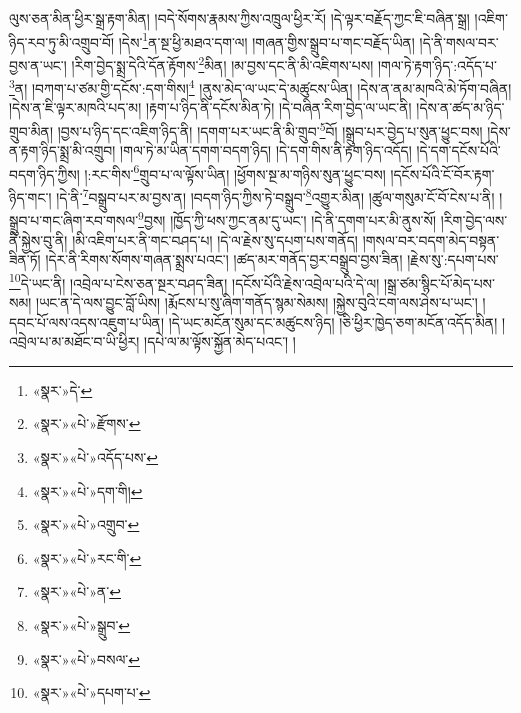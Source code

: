ལུས་ཅན་མིན་ཕྱིར་སྒྲ་རྟག་མིན། །བདེ་སོགས་རྣམས་ཀྱིས་འཁྲུལ་ཕྱིར་རོ། །དེ་ལྟར་བརྗོད་ཀྱང་ཇི་བཞིན་སྒྲ། །འཇིག་ཉིད་རབ་ཏུ་མི་འགྲུབ་བོ། །དེས་\footnote{«སྣར་»དེ་}ན་སྔ་ཕྱི་མཐའ་དག་ལ། །གཞན་གྱིས་སྒྲུབ་པ་གང་བརྗོད་ཡིན། །དེ་ནི་གསལ་བར་བྱས་ན་ཡང་། །རིག་བྱེད་སྨྲ་དེའི་དོན་རྟོགས་\footnote{«སྣར་»«པེ་»རྫོགས་}མིན། །མ་བྱས་དང་ནི་མི་འཇིགས་པས། །གལ་ཏེ་རྟག་ཉིད་:འདོད་པ་\footnote{«སྣར་»«པེ་»འདོད་པས་}ན། །བཀག་པ་ཙམ་གྱི་དངོས་:དག་གིས།\footnote{«སྣར་»«པེ་»དག་གི།} །ནུས་མེད་ལ་ཡང་དེ་མཚུངས་ཡིན། །དེས་ན་ནམ་མཁའི་མེ་ཏོག་བཞིན། །དེས་ན་ཇི་ལྟར་མཁའི་པད་མ། །རྟག་པ་ཉིད་ནི་དངོས་མིན་ཏེ། །དེ་བཞིན་རིག་བྱེད་ལ་ཡང་ནི། །དེས་ན་ཚད་མ་ཉིད་གྲུབ་མིན། །བྱས་པ་ཉིད་དང་འཇིག་ཉིད་ནི། །དགག་པར་ཡང་ནི་མི་གྲུབ་\footnote{«སྣར་»«པེ་»འགྲུབ་}བོ། །སྒྲུབ་པར་བྱེད་པ་སུན་ཕྱུང་བས། །དེས་ན་རྟག་ཉིད་སྨྲ་མི་འགྲུབ། །གལ་ཏེ་མ་ཡིན་དགག་བདག་ཉིད། །དེ་དག་གིས་ནི་རྟག་ཉིད་འདོད། །དེ་དག་དངོས་པོའི་བདག་ཉིད་ཀྱིས། །:རང་གིས་\footnote{«སྣར་»«པེ་»རང་གི་}གྲུབ་པ་ལ་ལྟོས་ཡིན། །ཕྱོགས་སྔ་མ་གཉིས་སུན་ཕྱུང་བས། །དངོས་པོའི་ངོ་བོར་རྟག་ཉིད་གང་། །དེ་ནི་\footnote{«སྣར་»«པེ་»ན་}བསྒྲུབ་པར་མ་བྱས་ན། །བདག་ཉིད་ཀྱིས་ཏེ་བསྒྲུབ་\footnote{«སྣར་»«པེ་»སྒྲུབ་}འགྱུར་མིན། །ཚུལ་གསུམ་ངོ་བོ་ངེས་པ་ནི། །སྒྲུབ་པ་གང་ཞིག་རབ་གསལ་\footnote{«སྣར་»«པེ་»བསལ་}བྱས། །ཁྱོད་ཀྱི་ཕས་ཀྱང་ནམ་དུ་ཡང་། །དེ་ནི་དགག་པར་མི་ནུས་སོ། །རིག་བྱེད་ལས་ནི་སྐྱེས་བུ་ནི། །མི་འཇིག་པར་ནི་གང་བཤད་པ། །དེ་ལ་རྗེས་སུ་དཔག་པས་གནོད། །གསལ་བར་བདག་མེད་བསྟན་ཟིན་ཏོ། །དེར་ནི་རིགས་སོགས་གཞན་སྨྲས་པའང་། །ཚད་མར་གནོད་བྱར་བསྒྲུབ་བྱས་ཟིན། །རྗེས་སུ་:དཔག་པས་\footnote{«སྣར་»«པེ་»དཔག་པ་}དེ་ཡང་ནི། །འབྲེལ་པ་ངེས་ཅན་སྔར་བཤད་ཟིན། །དངོས་པོའི་རྗེས་འབྲེལ་པའི་དེ་ལ། །སྒྲ་ཙམ་སྙིང་པོ་མེད་པས་སམ། །ཡང་ན་དེ་ལས་བྱུང་བློ་ཡིས། །རྨོངས་པ་སུ་ཞིག་གནོད་སྙམ་སེམས། །སྐྱེས་བུའི་ངག་ལས་ཤེས་པ་ཡང་། །དབང་པོ་ལས་འདས་འཇུག་པ་ཡིན། །དེ་ཡང་མངོན་སུམ་དང་མཚུངས་ཉིད། །ཅི་ཕྱིར་ཁྱེད་ཅག་མངོན་འདོད་མིན། །འབྲེལ་པ་མ་མཐོང་བ་ཡི་ཕྱིར། །དཔེ་ལ་མ་ལྟོས་སྐྱོན་མེད་པའང་། །
